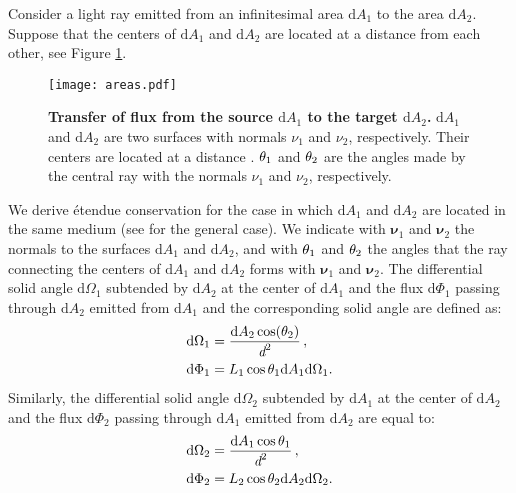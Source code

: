 Consider a light ray emitted from an infinitesimal area $\textrm{d}A_1$ to the area $\textrm{d}A_2$. Suppose that the centers of $\textrm{d}A_1$ and $\textrm{d}A_2$ 
are located at a distance  from each other, see Figure \ref{fig:etendue_conservation}.
\begin{figure}[t]
 \label{fig:etendue_conservation}
     \begin{center}
     \texttt{[image: areas.pdf]}
     \end{center}
     \caption{\textbf{Transfer of flux from the source $\textrm{d}A_1$ to the target $\textrm{d}A_2$.} $\textrm{d}A_1$ and $\textrm{d}A_2$ are two surfaces with normals $\nu_1$ and $\nu_2$, respectively. Their centers are located at a distance .
$\theta_1$ and $\theta_2$ are the angles made by the central ray with the normals $\nu_1$ and $\nu_2$, respectively.}
\label{fig:etendue_conservation}
 \end{figure}
We derive \'{e}tendue conservation for the case in which $\textrm{d}A_1$ and $\textrm{d}A_2$ are located in the same medium (see \cite{chaves2015introduction, koshel2012illumination} for the general case).
We indicate with $\boldsymbol{\nu}_1$ and $\boldsymbol{\nu}_2$ the normals to the surfaces $\textrm{d}A_1$ and $\textrm{d}A_2$, and with $\theta_1$ and $\theta_2$ the angles that the ray connecting the centers of $\textrm{d}A_1$ and $\textrm{d}A_2$ forms with $\boldsymbol{\nu}_1$ and $\boldsymbol{\nu}_2$. The differential solid angle $\textrm{d}\Omega_1$ subtended by $\textrm{d}A_2$ at the center of $\textrm{d}A_1$ and the flux $\textrm{d}\Phi_1$ passing through $\textrm{d}A_2$ emitted from $\textrm{d}A_1$ and the corresponding solid angle are defined as:
\begin{subequations}
\begin{align}
\label{eq:omega1}
\textrm{d}\Omega_1 &= \frac{\textrm{d}A_2\cos(\theta_2)}{\textit{d}^2}\,,\\
\textrm{d}\Phi_1 &= L_1 \cos\theta_1 \textrm{d}A_1 \textrm{d}\Omega_1. \label{eq:phi1}
\end{align}
\end{subequations}
Similarly, the differential solid angle $\textrm{d}\Omega_2$ subtended by $\textrm{d}A_1$ at the center of $\textrm{d}A_2$ and the flux $\textrm{d}\Phi_2$ passing through $\textrm{d}A_1$ emitted from $\textrm{d}A_2$ are equal to:
\begin{subequations}\begin{align}\label{eq:omega2}
\textrm{d}\Omega_2 &= \frac{\textrm{d}A_1\cos\theta_1}{\textit{d}^2}\,,\\
\textrm{d}\Phi_2 &= L_2 \cos\theta_2 \textrm{d}A_2 \textrm{d}\Omega_2.\label{eq:phi2}
\end{align}
\end{subequations}
